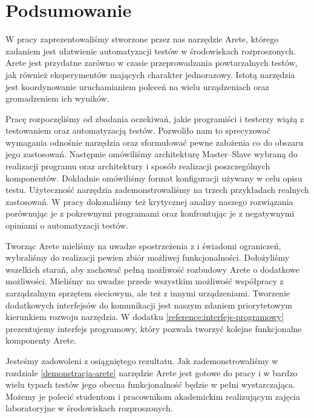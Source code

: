 \documentclass[00-praca-magisterska.tex]{subfiles}
\begin{document}
\chapter*{Podsumowanie}

W pracy zaprezentowaliśmy stworzone przez nas narzędzie Arete, którego zadaniem jest ułatwienie
automatyzacji testów w środowiskach rozproszonych. Arete jest przydatne zarówno
w czasie przeprowadzania powtarzalnych testów, jak również eksperymentów
mających charakter jednorazowy. Istotą narzędzia jest koordynowanie
uruchamianiem poleceń na wielu urządzeniach oraz gromadzeniem ich wyników.

Pracę rozpoczęliśmy od zbadania oczekiwań, jakie programiści i testerzy wiążą z testowaniem oraz
automatyzacją testów. Pozwoliło nam to sprecyzować wymagania odnośnie narzędzia
oraz sformułować pewne założenia co do obszaru jego zastosowań.  Następnie
omówiliśmy architekturę Master--Slave wybraną do realizacji programu oraz
architektury i sposób realizacji poszczególnych komponentów. Dokładnie
omówiliśmy format konfiguracji używany w celu opisu testu. Użyteczność narzędzia
zademonstrowaliśmy na trzech przykładach realnych zastosowań. W pracy
dokonaliśmy też krytycznej analizy naszego rozwiązania porównując je z
pokrewnymi programami oraz konfrontując je z negatywnymi opiniami o
automatyzacji testów.

Tworząc Arete mieliśmy na uwadze spostrzeżenia z \cite{snake-oil} i
świadomi ograniczeń, wybraliśmy do realizacji pewien zbiór możliwej
funkcjonalności. Dołożyliśmy wszelkich starań, aby zachować pełną możliwość
rozbudowy Arete o dodatkowe możliwości. Mieliśmy na uwadze przede wszystkim
możliwość współpracy z zarządzalnym sprzętem sieciowym, ale też z innymi
urządzeniami. Tworzenie dodatkowych interfejsów do komunikacji jest naszym
zdaniem priorytetowym kierunkiem rozwoju narzędzia. W dodatku \ref{reference:interfejs-programowy}
prezentujemy interfejs programowy, który pozwala tworzyć kolejne funkcjonalne
komponenty Arete.

Jesteśmy zadowoleni z osiągniętego rezultatu. Jak zademonstrowaliśmy w
rozdziale \ref{demonstracja-arete} narzędzie Arete jest gotowe do pracy i w
bardzo wielu typach testów jego obecna funkcjonalność będzie w pełni
wystarczająca.  Możemy je polecić studentom i pracownikom akademickim
realizującym zajęcia laboratoryjne w środowiskach rozproszonych.
\end{document}
